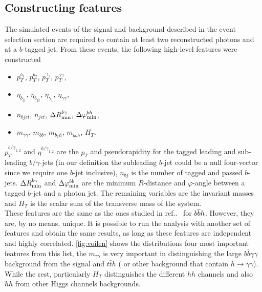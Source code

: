 \subsection{Constructing features \label{constructingfeat}}
The simulated events of the signal and background described in the event selection section are required to contain at least two reconstructed photons and at a $b$-tagged jet. From these events, the following high-level features were constructed
\begin{itemize}
	\setlength{\itemsep}{0pt}
	\item $p_T^{b_1}$, $p_T^{b_2}$, $p_T^{\gamma_1}$, $p_T^{\gamma\gamma}$, 
	\item $\eta_{b_{j1}}$, $\eta_{b_{j2}}$, $\eta_{\gamma_1}$, $\eta_{\gamma\gamma}$,
	\item $n_{bjet}$, $n_{jet}$, $\Delta R_{\rm min}^{b\gamma}$, $\Delta \varphi_{\rm min}^{bb}$, 
	\item $m_{\gamma\gamma}$, $m_{bb}$, $m_{b_{1} h}$, $m_{b\bar b h}$, $H_T$.
\end{itemize}
$p_T^{{b/\gamma}_{1,2}}$ and $\eta^{{b/\gamma}_{1,2}}$ are the $p_T$ and pseudorapidity for the tagged leading and sub-leading $b/\gamma$-jets (in our definition the subleading $b$-jet could be a null four-vector since we require one $b$-jet inclusive), $n_{bj}$ is the number of tagged and passed $b$-jets. $\Delta R_{\rm min}^{b\gamma}$ and $\Delta \varphi_{\rm min}^{bb}$ are the minimum $R$-distance and $\varphi$-angle between a tagged $b$-jet and a photon jet. The remaining variables are the invariant masses and $H_T$ is the scalar sum of the transverse mass of the system. \\ These features are the same as the ones studied in ref..~\cite{Grojean:2020ech} for $b\overline bh$. However, they are, by no means, unique. It is possible to run the analysis with another set of features and obtain the same results, as long as these features are independent and highly correlated. \autoref{fig:voilen} shows the distributions four most important features from this list, the $m_{\gamma \gamma}$ is very important in distinguishing the large $b \bar b \gamma \gamma$ background from the signal and $ t\bar t h$ ( or other background that contain $ h \to \gamma \gamma$). While the rest, particularly $ H_T$ distinguishes the different $hh$ channels and also $hh$ from other Higgs channels backgrounds.  
